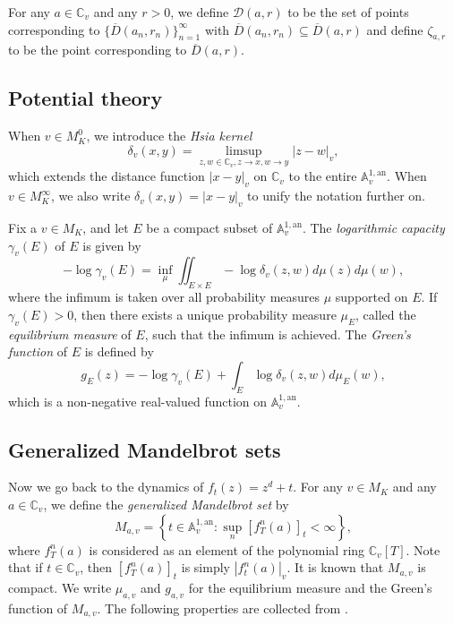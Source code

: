 \documentclass[10pt,a4paper]{amsart}
\numberwithin{equation}{section}
\theoremstyle{plain}
\theoremstyle{definition}
\theoremstyle{remark}
\newcommand{\A}{\mathbb A}
\newcommand{\C}{\mathbb C}
\newcommand{\an}{\mathrm{an}}
\begin{document}
For any $a\in\C_{v}$ and any $r>0$, we define $\mathcal{D}(a,r)$ to be
the set of points corresponding to
$\{\overline{D}(a_{n},r_{n})\}_{n=1}^{\infty}$ with
$\overline{D}(a_{n},r_{n})\subseteq\overline{D}(a,r)$ and define
$\zeta_{a,r}$ to be the point corresponding to $\overline{D}(a,r)$.

\subsection{Potential theory}\label{sec2.2}

When $v\in M_{K}^{0}$, we introduce the \textit{Hsia kernel}
\[
\delta_{v}(x,y)=\limsup_{z,w\in\C_{v},z\to x,w\to y}|z-w|_{v},
\]
which extends the distance function $|x-y|_{v}$ on $\C_{v}$ to the
entire $\A_{v}^{1,\an}$. When $v\in M_{K}^{\infty}$, we also write
$\delta_{v}(x,y)=|x-y|_{v}$ to unify the notation further on.

Fix a $v\in M_{K}$, and let $E$ be a compact subset of $\A_{v}^{1,\an}$.
The \textit{logarithmic capacity} $\gamma_{v}(E)$ of $E$ is given
by
\[
-\log\gamma_{v}(E)=\inf_{\mu}\iint_{E\times E}-\log\delta_{v}(z,w)d\mu(z)d\mu(w),
\]
where the infimum is taken over all probability measures $\mu$ supported
on $E$. If $\gamma_{v}(E)>0$, then there exists a unique probability
measure $\mu_{E}$, called the \textit{equilibrium measure} of $E$,
such that the infimum is achieved. The \textit{Green's function} of
$E$ is defined by
\[
g_{E}(z)=-\log\gamma_{v}(E)+\int_{E}\log\delta_{v}(z,w)d\mu_{E}(w),
\]
which is a non-negative real-valued function on $\A_{v}^{1,\an}$.

\subsection{Generalized Mandelbrot sets}\label{sec2.3}

Now we go back to the dynamics of $f_{t}(z)=z^{d}+t$. For any $v\in M_{K}$
and any $a\in\C_{v}$, we define the \textit{generalized Mandelbrot
set} by
\[
M_{a,v}=\left\{t\in\A_{v}^{1,\an}:\sup_{n}\left[f_{T}^{n}(a)\right]_{t}<\infty\right\},
\]
where $f_{T}^{n}(a)$ is considered as an element of the polynomial
ring $\C_{v}[T]$. Note that if $t\in\C_{v}$, then
$[f_{T}^{n}(a)]_{t}$ is simply $|f_{t}^{n}(a)|_{v}$. It is known
that $M_{a,v}$ is compact. We write $\mu_{a,v}$ and $g_{a,v}$ for
the equilibrium measure and the Green's function of $M_{a,v}$. The
following properties are collected from \cite[Section 3]{BD1}.
\end{document}
